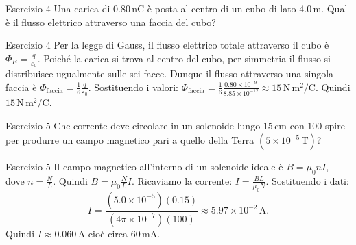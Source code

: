 \documentclass[a4paper]{article}
\begin{document}
\begin{snippetexercise}{Esercizio 4}
    Una carica di \(0.80\,\mathrm{nC}\) è posta al centro di un cubo di lato
    \(4.0\,\mathrm{m}\). Qual è il flusso elettrico attraverso una faccia del cubo?
\end{snippetexercise}
\begin{snippetsolution}{Esercizio 4}
    Per la legge di Gauss, il flusso elettrico totale attraverso il cubo è
    \(\Phi_E = \frac{q}{\varepsilon_0}.\)
    Poiché la carica si trova al centro del cubo, per simmetria il flusso si
    distribuisce ugualmente sulle sei facce. Dunque il flusso attraverso una
    singola faccia è
    \(\Phi_{\mathrm{faccia}} = \frac{1}{6}\frac{q}{\varepsilon_0}.\)
    Sostituendo i valori:
    \(\Phi_{\mathrm{faccia}} = \frac{1}{6} \frac{0.80 \times 10^{-9}}{8.85 \times 10^{-12}} \approx 15\,\mathrm{N\,m^2/C}.\)
    Quindi
    \(\boxed{15\,\mathrm{N\,m^2/C}}.\)
\end{snippetsolution}
\begin{snippetexercise}{Esercizio 5}
    Che corrente deve circolare in un solenoide lungo \(15\,\mathrm{cm}\) con
    \(100\) spire per produrre un campo magnetico pari a quello della Terra
    \((5 \times 10^{-5}\,\mathrm{T})\)?
\end{snippetexercise}
\begin{snippetsolution}{Esercizio 5}
    Il campo magnetico all'interno di un solenoide ideale è
    \(B = \mu_0 n I,\)
    dove
    \(n = \frac{N}{L}.\)
    Quindi
    \(B = \mu_0 \frac{N}{L} I.\)
    Ricaviamo la corrente:
    \(I = \frac{BL}{\mu_0 N}.\)
    Sostituendo i dati:
    \[
        I =
        \frac{
            \left(5.0 \times 10^{-5}\right)(0.15)
        }{
            \left(4\pi \times 10^{-7}\right)(100)
        }
        \approx
        5.97 \times 10^{-2}\,\mathrm{A}.
    \]
    Quindi
    \(\boxed{I \approx 0.060\,\mathrm{A}}\)
    cioè circa \(60\,\mathrm{mA}\).
\end{snippetsolution}
\end{document}
